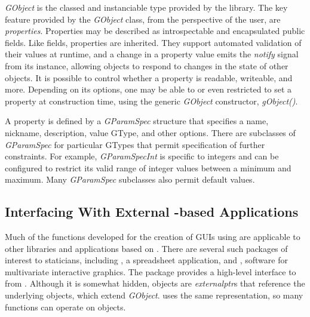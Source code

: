 \documentclass[article]{jss}
\begin{document}
\emph{GObject} is the classed and instanciable type provided by the
 library.  The key feature provided by the \emph{GObject} class, from the perspective of the 
 user, are \emph{properties}. Properties may be described
as introspectable and encapsulated public fields. Like fields, properties are inherited. They support automated validation 
of their values at runtime, and a change in a property value emits the 
\emph{notify} signal from its instance, allowing objects to respond
to changes in the state of other objects. It is possible to control
whether a 
property is readable, writeable, and more. Depending on its options,
one may be able to or even restricted to set a property at
construction time, 
using the generic \emph{GObject} constructor, \emph{gObject()}. 

A property is defined by a \emph{GParamSpec} structure that specifies
a name, 
nickname, description, value GType, and other options. There are
subclasses of 
\emph{GParamSpec} for particular GTypes that permit specification of
further 
constraints. For example, \emph{GParamSpecInt} is specific to integers
and can be
configured to restrict its valid range of integer values between a
minimum and maximum.
Many \emph{GParamSpec} subclasses also permit default values.

\subsection[Interfacing With External GObject-based
Applications]{Interfacing With External -based
Applications}

Much of the  functions developed for the
creation of GUIs using  are applicable to other libraries
and applications based on . There are several such
packages of
interest to staticians, including , a spreadsheet
application, and
, software for multivariate interactive graphics. The
package \citep{rggobi} provides a high-level interface to 
from 
. Although it is somewhat hidden,  objects are 
\emph{externalptr}s that reference the underlying  objects,
which
extend \emph{GObject}.  uses the same 
representation, so
many  functions can operate on  objects.
\end{document}
